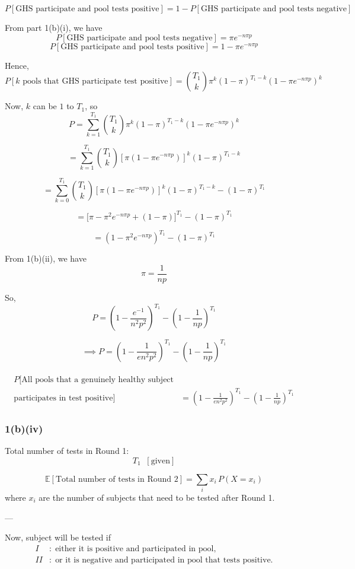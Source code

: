 \documentclass[12pt]{article}
\begin{document}
\[
P[\text{GHS participate and pool tests positive}] 
= 1 - P[\text{GHS participate and pool tests negative}]
\]

From part 1(b)(i), we have
\[
P[\text{GHS participate and pool tests negative}] = \pi e^{-n\pi p}
\]
\[
P[\text{GHS participate and pool tests positive}] 
= 1 - \pi e^{-n\pi p}
\]

Hence,
\[
P[\text{$k$ pools that GHS participate test positive}] 
= \binom{T_1}{k} \pi^k (1-\pi)^{T_1-k} 
\left(1 - \pi e^{-n\pi p}\right)^k
\]

Now, $k$ can be $1$ to $T_1$, so
\[
P = \sum_{k=1}^{T_1} \binom{T_1}{k} \pi^k (1-\pi)^{T_1-k} 
\left(1 - \pi e^{-n\pi p}\right)^k
\]

\[
= \sum_{k=1}^{T_1} \binom{T_1}{k} 
\left[\pi \left(1 - \pi e^{-n\pi p}\right)\right]^k 
(1-\pi)^{T_1-k}
\]

\[
= \sum_{k=0}^{T_1} \binom{T_1}{k} 
\left[\pi \left(1 - \pi e^{-n\pi p}\right)\right]^k 
(1-\pi)^{T_1-k}
- (1-\pi)^{T_1}
\]

\[
= \Big[\pi - \pi^2 e^{-n\pi p} + (1-\pi)\Big]^{T_1} - (1-\pi)^{T_1}
\]

\[
= \left(1 - \pi^2 e^{-n\pi p}\right)^{T_1} - (1-\pi)^{T_1}
\]


From 1(b)(ii), we have
\[
\pi = \frac{1}{np}
\]

So,
\[
P = \left(1 - \frac{e^{-1}}{n^2 p^2}\right)^{T_1} 
- \left(1 - \frac{1}{np}\right)^{T_1}
\]

\[
\implies P = \left(1 - \frac{1}{e n^2 p^2}\right)^{T_1} 
- \left(1 - \frac{1}{np}\right)^{T_1}
\]
\\
\[
\boxed{
\begin{aligned}
  P\big[\text{All pools that a genuinely healthy subject}\\
  \text{participates in test positive}\big]
  &= \left(1 - \frac{1}{e n^2 p^2}\right)^{T_1} 
     - \left(1 - \frac{1}{np}\right)^{T_1}
\end{aligned}
}
\]
\subsubsection{1(b)(iv)}

Total number of tests in Round 1:
\[
T_1 \; \; [\text{given}]
\]

\[
\mathbb{E}[\text{Total number of tests in Round 2}] 
= \sum_i x_i \, P(X = x_i)
\]
where $x_i$ are the number of subjects that need to be tested after Round 1.

---

Now, subject will be tested if  
\[
\begin{aligned}
I &: \; \text{either it is positive and participated in pool}, \\
II &: \; \text{or it is negative and participated in pool that tests positive}.
\end{aligned}
\]
\end{document}
